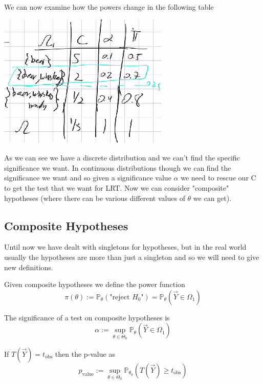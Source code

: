 \documentclass[../main.tex]{subfiles}
\begin{document}
\begin{example}
\begin{center}
\end{center}
We can now examine how the powers change in the following table
\begin{center}
    \includegraphics{images/Lecture 12 Total Table.png}
\end{center}
\end{example}
As we can see we have a discrete distribution and we can't find the specific significance we want. In continuous distributions though we can find the significance we want and so given a significance value $\alpha$ we need to rescue our C to get the test that we want for LRT. Now we can consider "composite" hypotheses (where there can be various different values of $\theta$ we can get). 
\newpage
\subsection{Composite Hypotheses}
Until now we have dealt with singletons for hypotheses, but in the real world usually the hypotheses are more than just a singleton and so we will need to give new definitions.
\begin{definition}
Given composite hypotheses we define the power function
\[\pi(\theta):=\mathbb{P}_{\theta}(\text{"reject } H_0\text{"}) = \mathbb{P}_{\theta}(\overrightarrow{Y}\in\Omega_1)\]
\end{definition}
\begin{definition}
The significance of a test on composite hypotheses is
\[\alpha:=\sup_{\theta\in\Theta_0}\mathbb{P}_{\theta}(\overrightarrow{Y}\in\Omega_1)\]
\end{definition}
\begin{definition}
If $T(\overrightarrow{Y}) = t_{\text{obs}}$ then the p-value as
\[p_{\text{value}}:=\sup_{\theta\in\Theta_0}\mathbb{P}_{\theta_0}(T(\overrightarrow{Y})\geq t_{\text{obs}})\]
\end{definition}
\end{document}
